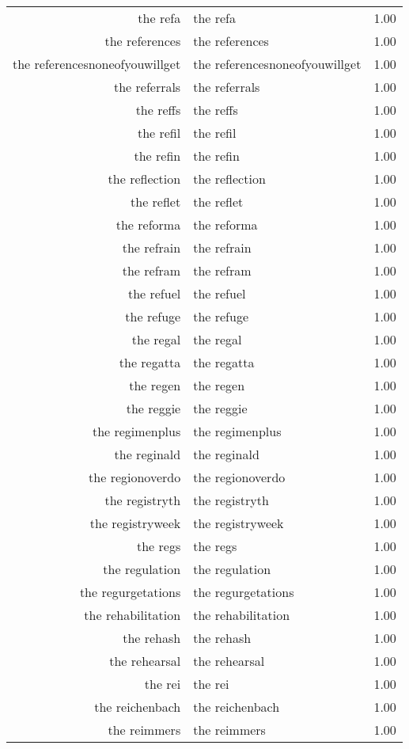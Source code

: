 \begin{table}[ht]
\begin{tabular}{rlr}
  the refa & the refa & 1.00 \\ 
  the references & the references & 1.00 \\ 
  the referencesnoneofyouwillget & the referencesnoneofyouwillget & 1.00 \\ 
  the referrals & the referrals & 1.00 \\ 
  the reffs & the reffs & 1.00 \\ 
  the refil & the refil & 1.00 \\ 
  the refin & the refin & 1.00 \\ 
  the reflection & the reflection & 1.00 \\ 
  the reflet & the reflet & 1.00 \\ 
  the reforma & the reforma & 1.00 \\ 
  the refrain & the refrain & 1.00 \\ 
  the refram & the refram & 1.00 \\ 
  the refuel & the refuel & 1.00 \\ 
  the refuge & the refuge & 1.00 \\ 
  the regal & the regal & 1.00 \\ 
  the regatta & the regatta & 1.00 \\ 
  the regen & the regen & 1.00 \\ 
  the reggie & the reggie & 1.00 \\ 
  the regimenplus & the regimenplus & 1.00 \\ 
  the reginald & the reginald & 1.00 \\ 
  the regionoverdo & the regionoverdo & 1.00 \\ 
  the registryth & the registryth & 1.00 \\ 
  the registryweek & the registryweek & 1.00 \\ 
  the regs & the regs & 1.00 \\ 
  the regulation & the regulation & 1.00 \\ 
  the regurgetations & the regurgetations & 1.00 \\ 
  the rehabilitation & the rehabilitation & 1.00 \\ 
  the rehash & the rehash & 1.00 \\ 
  the rehearsal & the rehearsal & 1.00 \\ 
  the rei & the rei & 1.00 \\ 
  the reichenbach & the reichenbach & 1.00 \\ 
  the reimmers & the reimmers & 1.00 \\ 

\end{tabular}
\end{table}
